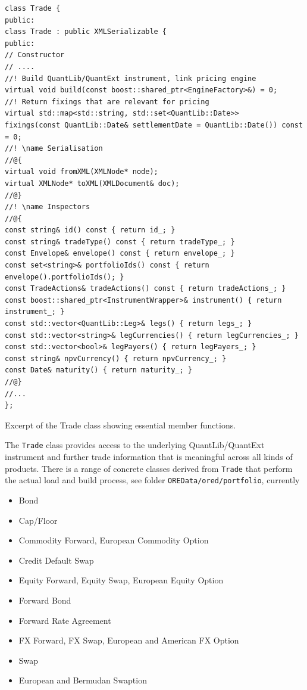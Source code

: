\documentclass[12pt, a4paper]{article}
\begin{document}
\begin{listing}[H]
\begin{verbatim}
class Trade {
public:
class Trade : public XMLSerializable {
public:
// Constructor
// ....
//! Build QuantLib/QuantExt instrument, link pricing engine
virtual void build(const boost::shared_ptr<EngineFactory>&) = 0;
//! Return fixings that are relevant for pricing
virtual std::map<std::string, std::set<QuantLib::Date>>
fixings(const QuantLib::Date& settlementDate = QuantLib::Date()) const = 0;
//! \name Serialisation
//@{
virtual void fromXML(XMLNode* node);
virtual XMLNode* toXML(XMLDocument& doc);
//@}
//! \name Inspectors
//@{
const string& id() const { return id_; }
const string& tradeType() const { return tradeType_; }
const Envelope& envelope() const { return envelope_; }
const set<string>& portfolioIds() const { return envelope().portfolioIds(); }
const TradeActions& tradeActions() const { return tradeActions_; }
const boost::shared_ptr<InstrumentWrapper>& instrument() { return instrument_; }
const std::vector<QuantLib::Leg>& legs() { return legs_; }
const std::vector<string>& legCurrencies() { return legCurrencies_; }
const std::vector<bool>& legPayers() { return legPayers_; }
const string& npvCurrency() { return npvCurrency_; }
const Date& maturity() { return maturity_; }
//@}
//...
};
\end{verbatim}
\caption{Excerpt of the Trade class showing essential member functions.}
\label{1st:trade}
\end{listing}

The {\tt Trade} class provides access to the underlying QuantLib/QuantExt instrument and further trade information that is meaningful across all kinds of products. There is a range of concrete classes derived from {\tt Trade} that perform the actual load and build process, see folder {\tt OREData/ored/portfolio}, currently
\begin{itemize}
\item Bond
\item Cap/Floor
\item Commodity Forward, European Commodity Option
\item Credit Default Swap
\item Equity Forward, Equity Swap, European Equity Option
\item Forward Bond
\item Forward Rate Agreement
\item FX Forward, FX Swap, European and American FX Option
\item Swap
\item European and Bermudan Swaption
\end{itemize}
\end{document}
